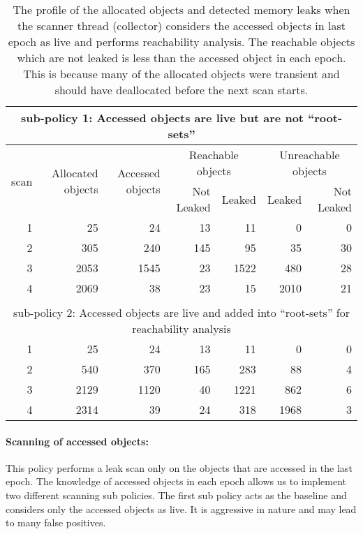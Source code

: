 \begin{table*}
\begin{center}
\begin{tabular}{|r|r|r|r|r|r|r|}
  \hline
      \multicolumn{7}{|c|}{sub-policy 1: Accessed objects are live but are not ``root-sets''}  \\
  \hline
    \multirow{2}{*}{scan} & \multirow{2}{*}{Allocated objects} & \multirow{2}{*}{Accessed objects} & \multicolumn{2}{|c|}{Reachable objects} & \multicolumn{2}{|c|}{Unreachable objects} \\
     \hhline{~~~----}
  & & & Not Leaked & Leaked & Leaked & Not Leaked\\
\hline
  1 & 25 & 24 & 13 & 11 & 0 & 0 \\
  \hline
  2 & 305 & 240 & 145 & 95 & 35 & 30 \\
  \hline
  3 & 2053 & 1545 & 23 & 1522 & 480 & 28 \\
    \hline
  4 & 2069 & 38 & 23 & 15 & 2010 & 21 \\ \hline
   \multicolumn{7}{c}{} \\ \hline
     \multicolumn{7}{|c|}{sub-policy 2: Accessed objects are live and added into ``root-sets'' for reachability analysis  }  \\
  \hline
  1 & 25 & 24 & 13 & 11 & 0 & 0 \\
  \hline
  2 & 540 & 370 & 165 & 283 & 88 & 4 \\
  \hline
  3 & 2129 & 1120 & 40 & 1221 & 862 & 6 \\
    \hline
  4 & 2314 & 39 & 24 & 318 & 1968 & 3 \\ \hline
\end{tabular}
\caption[Profile of allocated objects with leak scan policies. The collector performs scan on objects accessed in last epoch.]{\label{table:leak_detctor-leak_eval}The profile of the allocated objects and detected memory leaks when the scanner thread (collector) considers the accessed objects in last epoch as live and performs reachability analysis. The reachable objects which are not leaked is less than the accessed object in each epoch. This is because many of the allocated objects were transient and should have deallocated before the next scan starts.}
\end{center}
\end{table*}

\paragraph{Scanning of accessed objects:} This policy performs a leak scan only on the objects that are accessed in the last epoch. The knowledge of accessed objects in each epoch allows us to implement two different scanning sub policies. The first sub policy acts as the baseline and considers only the accessed objects as live. It is aggressive in nature and may lead to many false positives.

